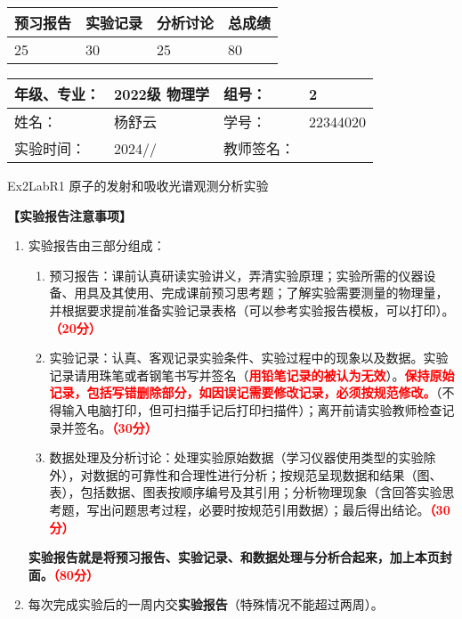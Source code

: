 \documentclass[dvipsnames, svgnames,a4paper,11pt]{article}
\begin{document}
	
	
	
	
	\begin{table}
		\renewcommand\arraystretch{1.7}
		\begin{tabularx}{\textwidth}{
				|X|X|X|X
				|X|X|X|X|}
			\hline
			\multicolumn{2}{|c|}{预习报告}&\multicolumn{2}{|c|}{实验记录}&\multicolumn{2}{|c|}{分析讨论}&\multicolumn{2}{|c|}{总成绩}\\
			\hline
			\LARGE25 & & \LARGE30 & & \LARGE25 & & \LARGE80 & \\
			\hline
		\end{tabularx}
	\end{table}
	
	\begin{table}
		\renewcommand\arraystretch{1.7}
		\begin{tabularx}{\textwidth}{|X|X|X|X|}
			\hline
			年级、专业： & 2022级 物理学 &组号： & 2\\
			\hline
			姓名： & 杨舒云  & 学号： & 22344020\\
			\hline
			实验时间： & 2024// & 教师签名： & \\
			\hline
		\end{tabularx}
	\end{table}
	
	\begin{center}
		\LARGE Ex2LabR1 \quad 原子的发射和吸收光谱观测分析实验
	\end{center}
	
	
	\textbf{【实验报告注意事项】}
	\begin{enumerate}
		\item 实验报告由三部分组成：
		\begin{enumerate}
			\item 预习报告：课前认真研读实验讲义，弄清实验原理；实验所需的仪器设备、用具及其使用、完成课前预习思考题；了解实验需要测量的物理量，并根据要求提前准备实验记录表格（可以参考实验报告模板，可以打印）。\textcolor{red}{\textbf{（20分）}}
			\item 实验记录：认真、客观记录实验条件、实验过程中的现象以及数据。实验记录请用珠笔或者钢笔书写并签名（\textcolor{red}{\textbf{用铅笔记录的被认为无效}}）。\textcolor{red}{\textbf{保持原始记录，包括写错删除部分，如因误记需要修改记录，必须按规范修改。}}（不得输入电脑打印，但可扫描手记后打印扫描件）；离开前请实验教师检查记录并签名。\textcolor{red}{\textbf{（30分）}}
			\item 数据处理及分析讨论：处理实验原始数据（学习仪器使用类型的实验除外），对数据的可靠性和合理性进行分析；按规范呈现数据和结果（图、表），包括数据、图表按顺序编号及其引用；分析物理现象（含回答实验思考题，写出问题思考过程，必要时按规范引用数据）；最后得出结论。\textcolor{red}{\textbf{（30分）}}
		\end{enumerate}
		\textbf{实验报告就是将预习报告、实验记录、和数据处理与分析合起来，加上本页封面。\textcolor{red}{（80分）}}
		\item 每次完成实验后的一周内交\textbf{实验报告}（特殊情况不能超过两周）。
	\end{enumerate}
	
\end{document}
